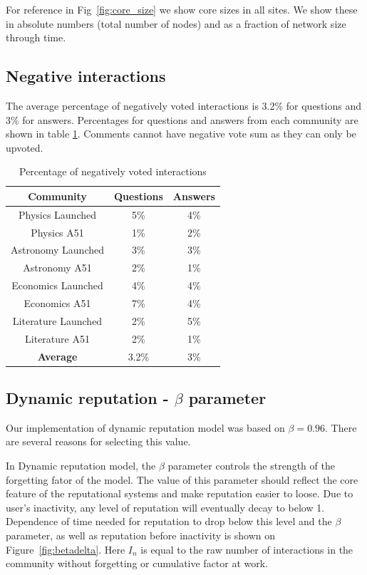 For reference in Fig~\ref{fig:core_size} we show core sizes in all sites. We show these in absolute numbers (total number of nodes) and as a fraction of network size through time.

\subsection{Negative interactions}

The average percentage of negatively voted interactions is 3.2\% for questions and 3\% for answers. Percentages for questions and answers from each community are shown in table \ref{tab:negint}.  Comments cannot have negative vote sum as they can only be upvoted.

\begin{table}[hbt!]
	\centering
	\caption{Percentage of negatively voted interactions}
	\label{tab:negint}
	\begin{tabular}{@{}ccc@{}}
		\toprule
		Community           & Questions & Answers \\ \midrule
		Physics Launched    & 5\%       & 4\%     \\
		Physics A51         & 1\%       & 2\%     \\
		Astronomy Launched  & 3\%       & 3\%     \\
		Astronomy A51       & 2\%       & 1\%     \\
		Economics Launched  & 4\%       & 4\%     \\
		Economics A51       & 7\%       & 4\%     \\
		Literature Launched & 2\%       & 5\%     \\
		Literature A51      & 2\%       & 1\%     \\ \midrule
		\textbf{Average}    & 3.2\%     & 3\%     \\ \bottomrule
	\end{tabular}
\end{table}

\subsection{Dynamic reputation - $\beta$ parameter}

Our implementation of dynamic reputation model was based on $\beta = 0.96$. There are several reasons for selecting this value.

In Dynamic reputation model, the $\beta$ parameter controls the strength of the forgetting fator of the model.  The value of this parameter should reflect the core feature of the reputational systems and make reputation easier to loose. Due to user's inactivity, any level of reputation will eventually decay to below 1. Dependence of time needed for reputation to drop below this level and the $\beta$ parameter, as well as reputation before inactivity is shown on Figure~\ref{fig:betadelta}. Here $I_n$ is equal to the raw number of interactions in the community without forgetting or cumulative factor at work.

